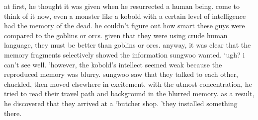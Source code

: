  at first, he thought it was given when he resurrected a human being.
come to think of it now, even a monster like a kobold with a certain level of intelligence had the memory of the dead.
 he couldn’t figure out how smart these guys were compared to the goblins or orcs.
 given that they were using crude human language, they must be better than goblins or orcs.
 anyway, it was clear that the memory fragments selectively showed the information sungwoo wanted.
‘ugh? i can’t see well.
’however, the kobold’s intellect seemed weak because the reproduced memory was blurry.
sungwoo saw that they talked to each other, chuckled, then moved elsewhere in excitement.
 with the utmost concentration, he tried to read their travel path and background in the blurred memory.
 as a result, he discovered that they arrived at a ‘butcher shop.
’they installed something there.

